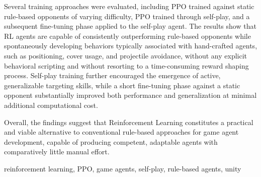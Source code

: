 Several training approaches were evaluated, including PPO trained against
static rule-based opponents of varying difficulty, PPO trained through
self-play, and a subsequent fine-tuning phase applied to the self-play agent.
The results show that RL agents are capable of consistently outperforming
rule-based opponents while spontaneously developing behaviors typically
associated with hand-crafted agents, such as positioning, cover usage, and
projectile avoidance, without any explicit behavioral scripting and without
resorting to a time-consuming reward shaping process. Self-play training
further encouraged the emergence of active, generalizable targeting skills,
while a short fine-tuning phase against a static opponent substantially
improved both performance and generalization at minimal additional
computational cost.

Overall, the findings suggest that Reinforcement Learning constitutes a
practical and viable alternative to conventional rule-based approaches for
game agent development, capable of producing competent, adaptable agents
with comparatively little manual effort.

\vspace{8cm}
 reinforcement learning, PPO, game agents, self-play, rule-based agents, unity